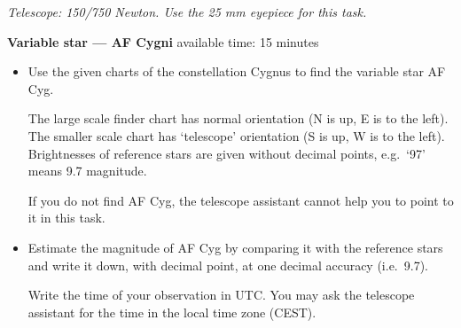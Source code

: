 \emph{Telescope: 150/750 Newton. Use the 25 mm eyepiece for this task.}

\textbf{Variable star --- AF Cygni} \hfill available time: 15 minutes

\begin{itemize}
\item Use the given charts of the constellation Cygnus to find the variable
  star AF Cyg.

  The large scale finder chart has normal orientation (N is up, E is to the
  left). The smaller scale chart has `telescope' orientation (S is up, W is
  to the left). Brightnesses of reference stars are given without decimal
  points, e.g.\ `97' means 9.7 magnitude.

  If you do not find AF Cyg, the telescope assistant cannot help you to
  point to it in this task.
\item Estimate the magnitude of AF Cyg by comparing it with the reference
  stars and write it down, with decimal point, at one decimal accuracy
  (i.e.\ 9.7).

  Write the time of your observation in UTC. You may ask the telescope
  assistant for the time in the local time zone (CEST).
\end{itemize}

